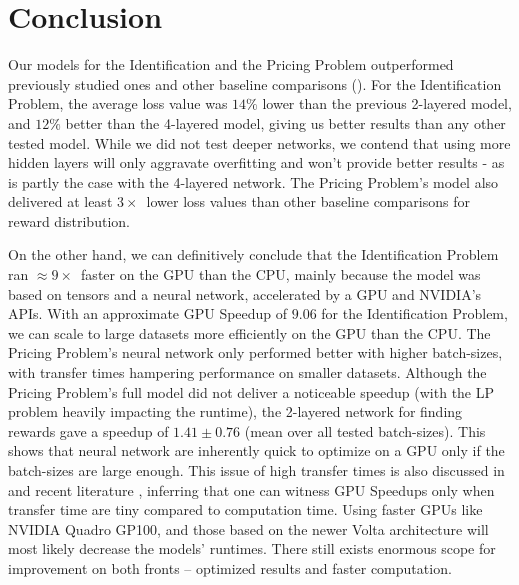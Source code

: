 \chapter{Conclusion} \label{sec:Conclusion}
Our models for the Identification and the Pricing Problem outperformed previously studied ones \cite{Xue2016Avi2} and other baseline comparisons (). For the Identification Problem, the average loss value was $14\%$ lower than the previous 2-layered model, and $12\%$ better than the 4-layered model, giving us better results than any other tested model. While we did not test deeper networks, we contend that using more hidden layers will only aggravate overfitting and won't provide better results - as is partly the case with the 4-layered network. The Pricing Problem's model also delivered at least $3\times$~lower loss values than other baseline comparisons for reward distribution.

On the other hand, we can definitively conclude that the Identification Problem ran $\approx 9\times$~faster on the GPU than the CPU, mainly because the model was based on tensors and a neural network, accelerated by a GPU and NVIDIA's APIs. With an approximate GPU Speedup of $9.06$ for the Identification Problem, we can scale to large datasets more efficiently on the GPU than the CPU. The Pricing Problem's neural network only performed better with higher batch-sizes, with transfer times hampering performance on smaller datasets. Although the Pricing Problem's full model did not deliver a noticeable speedup (with the LP problem heavily impacting the runtime), the 2-layered network for finding rewards gave a speedup of $1.41\pm0.76$ (mean over all tested batch-sizes). This shows that neural network are inherently quick to optimize on a GPU only if the batch-sizes are large enough. This issue of high transfer times is also discussed in  and recent literature \cite[Appendix~B]{PattersonARM}, inferring that one can witness GPU Speedups only when transfer time are tiny compared to computation time. Using faster GPUs like NVIDIA Quadro GP100, and those based on the newer Volta architecture will most likely decrease the models' runtimes. There still exists enormous scope for improvement on both fronts -- optimized results and faster computation.

